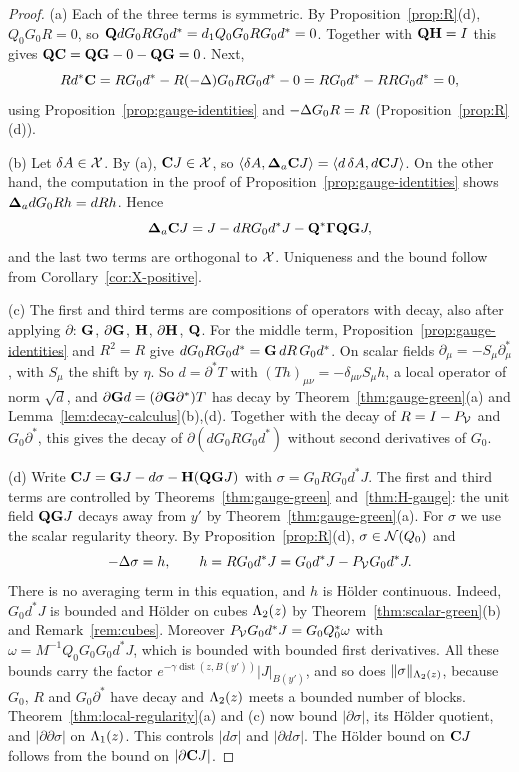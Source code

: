\begin{proof}
(a) Each of the three terms is symmetric. By Proposition~\ref{prop:R}(d), $Q_0G_0R=0$, so $\mathbf Q dG_0RG_0d^*=d_1 Q_0G_0RG_0d^*=0$. Together with $\mathbf Q\mathbf H=I$ this gives $\mathbf Q\mathbf C=\mathbf Q\mathbf G-0-\mathbf Q\mathbf G=0$. Next,
\[
Rd^*\mathbf C=RG_0d^*-R(-\Delta)G_0RG_0d^*-0=RG_0d^*-RRG_0d^*=0,
\]
using Proposition~\ref{prop:gauge-identities} and $-\Delta G_0R=R$ (Proposition~\ref{prop:R}(d)).

(b) Let $\delta A\in\mathcal X$. By (a), $\mathbf C J\in\mathcal X$, so $\langle \delta A,\boldsymbol{\Delta}_a\mathbf C J\rangle=\langle d\,\delta A,d\mathbf C J\rangle$. On the other hand, the computation in the proof of Proposition~\ref{prop:gauge-identities} shows $\boldsymbol{\Delta}_adG_0Rh=dRh$. Hence
\[
\boldsymbol{\Delta}_a\mathbf C J=J-dRG_0d^*J-\mathbf Q^*\boldsymbol\Gamma\mathbf Q\mathbf G J,
\]
and the last two terms are orthogonal to $\mathcal X$. Uniqueness and the bound follow from Corollary~\ref{cor:X-positive}.

(c) The first and third terms are compositions of operators with decay, also after applying $\partial$: $\mathbf G$, $\partial\mathbf G$, $\mathbf H$, $\partial\mathbf H$, $\mathbf Q$. For the middle term, Proposition~\ref{prop:gauge-identities} and $R^2=R$ give $dG_0RG_0d^*=\mathbf G\,dR\,G_0d^*$. On scalar fields $\partial_\mu=-S_\mu\partial^*_\mu$, with $S_\mu$ the shift by $\eta$. So $d=\partial^*T$ with $(Th)_{\mu\nu}=-\delta_{\mu\nu}S_\mu h$, a local operator of norm $\sqrt d$, and $\partial\mathbf G d=(\partial\mathbf G\partial^*)T$ has decay by Theorem~\ref{thm:gauge-green}(a) and Lemma~\ref{lem:decay-calculus}(b),(d). Together with the decay of $R=I-P_\mathcal V$ and $G_0\partial^*$, this gives the decay of $\partial(dG_0RG_0d^*)$ without second derivatives of $G_0$.

(d) Write $\mathbf C J=\mathbf G J-d\sigma-\mathbf H(\mathbf Q\mathbf G J)$ with $\sigma=G_0RG_0d^*J$. The first and third terms are controlled by Theorems~\ref{thm:gauge-green} and~\ref{thm:H-gauge}: the unit field $\mathbf Q\mathbf G J$ decays away from $y'$ by Theorem~\ref{thm:gauge-green}(a). For $\sigma$ we use the scalar regularity theory. By Proposition~\ref{prop:R}(d), $\sigma\in\mathcal N(Q_0)$ and
\[
-\Delta\sigma=h,\qquad h=RG_0d^*J=G_0d^*J-P_\mathcal V G_0d^*J .
\]
There is no averaging term in this equation, and $h$ is H\"older continuous. Indeed, $G_0d^*J$ is bounded and H\"older on cubes $\Lambda_2(z)$ by Theorem~\ref{thm:scalar-green}(b) and Remark~\ref{rem:cubes}. Moreover $P_\mathcal V G_0d^*J=G_0Q_0^*\omega$ with $\omega=M^{-1}Q_0G_0G_0d^*J$, which is bounded with bounded first derivatives. All these bounds carry the factor $e^{-\gamma\operatorname{dist}(z,B(y'))}|J|_{B(y')}$, and so does $\|\sigma\|_{\Lambda_2(z)}$, because $G_0$, $R$ and $G_0\partial^*$ have decay and $\Lambda_2(z)$ meets a bounded number of blocks. Theorem~\ref{thm:local-regularity}(a) and (c) now bound $|\partial\sigma|$, its H\"older quotient, and $|\partial\partial\sigma|$ on $\Lambda_1(z)$. This controls $|d\sigma|$ and $|\partial d\sigma|$. The H\"older bound on $\mathbf C J$ follows from the bound on $|\partial\mathbf C J|$.
\end{proof}

